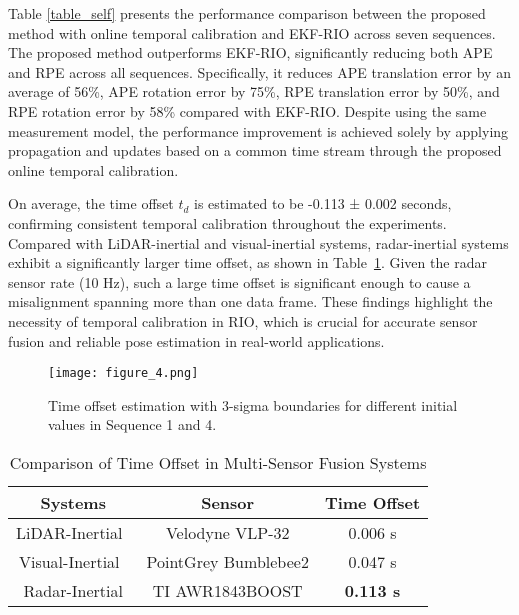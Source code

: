 Table \ref{table_self} presents the performance comparison between the proposed method with online temporal calibration and EKF-RIO across seven sequences. The proposed method outperforms EKF-RIO, significantly reducing both APE and RPE across all sequences. Specifically, it reduces APE translation error by an average of 56\%, APE rotation error by 75\%, RPE translation error by 50\%, and RPE rotation error by 58\% compared with EKF-RIO. Despite using the same measurement model, the performance improvement is achieved solely by applying propagation and updates based on a common time stream through the proposed online temporal calibration.

On average, the time offset \( t_d \) is estimated to be -0.113 ± 0.002 seconds, confirming consistent temporal calibration throughout the experiments. Compared with LiDAR-inertial and visual-inertial systems, radar-inertial systems exhibit a significantly larger time offset, as shown in Table~\ref{time_offset_comparison}. Given the radar sensor rate (10 Hz), such a large time offset is significant enough to cause a misalignment spanning more than one data frame. These findings highlight the necessity of temporal calibration in RIO, which is crucial for accurate sensor fusion and reliable pose estimation in real-world applications.

\begin{figure}[t]
\centering
\texttt{[image: figure\_4.png]}
\caption{Time offset estimation with 3-sigma boundaries for different initial values in Sequence 1 and 4.}
\label{sq5}
\end{figure}

\begin{table}[t]
\centering
\caption{Comparison of Time Offset in Multi-Sensor Fusion Systems}
\label{time_offset_comparison}
\begin{tabular}{|c|c|c|} 
\hline
\textbf{Systems} & \textbf{Sensor} & \textbf{Time Offset} \\ 
\hline
LiDAR-Inertial~\cite{10113826} & Velodyne VLP-32 & 0.006 s\\ 
\hline
Visual-Inertial~\cite{li2014online} & PointGrey Bumblebee2 & 0.047 s\\ 
\hline
Radar-Inertial & TI AWR1843BOOST & \textbf{0.113 s} \\
\hline
\end{tabular}
\end{table}

